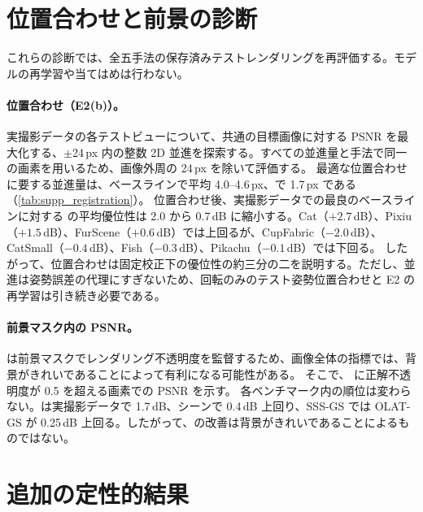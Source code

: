 \documentclass[10pt,twocolumn,letterpaper]{article}
\begin{document}




\section{位置合わせと前景の診断}
\label{sec:s_registration}
これらの診断では、全五手法の保存済みテストレンダリングを再評価する。モデルの再学習や当てはめは行わない。

\paragraph{位置合わせ（E2(b)）。}
実撮影データの各テストビューについて、共通の目標画像に対する PSNR を最大化する、$\pm$24\,px 内の整数 2D 並進を探索する。すべての並進量と手法で同一の画素を用いるため、画像外周の 24\,px を除いて評価する。
最適な位置合わせに要する並進量は、ベースラインで平均 4.0--4.6\,px、\ours で 1.7\,px である（\cref{tab:supp_registration}）。
位置合わせ後、実撮影データでの最良のベースラインに対する \ours の平均優位性は 2.0 から 0.7\,dB に縮小する。Cat（$+2.7$\,dB）、Pixiu（$+1.5$\,dB）、FurScene（$+0.6$\,dB）では上回るが、CupFabric（$-2.0$\,dB）、CatSmall（$-0.4$\,dB）、Fish（$-0.3$\,dB）、Pikachu（$-0.1$\,dB）では下回る。
したがって、位置合わせは固定校正下の優位性の約三分の二を説明する。ただし、並進は姿勢誤差の代理にすぎないため、回転のみのテスト姿勢位置合わせと E2 の再学習は引き続き必要である。



\paragraph{前景マスク内の PSNR。}
\ours は前景マスクでレンダリング不透明度を監督するため、画像全体の指標では、背景がきれいであることによって有利になる可能性がある。
そこで、 に正解不透明度が 0.5 を超える画素での PSNR を示す。
各ベンチマーク内の順位は変わらない。\ours は実撮影データで 1.7\,dB、\gsthree シーンで 0.4\,dB 上回り、SSS-GS では OLAT-GS が 0.25\,dB 上回る。したがって、\ours の改善は背景がきれいであることによるものではない。



\section{追加の定性的結果}
\label{sec:s_qual}
\end{document}
